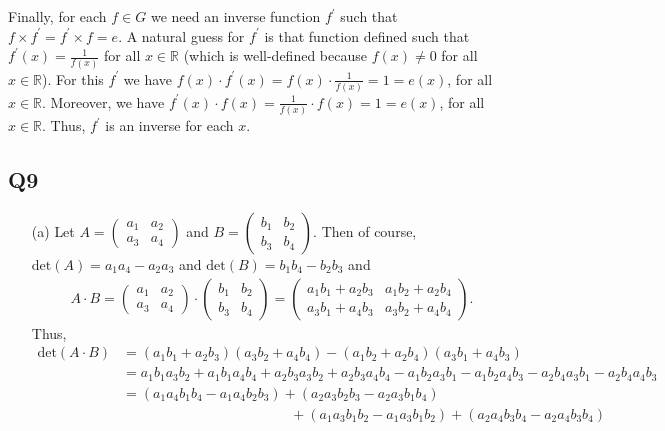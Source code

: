\documentclass[12pt]{article}
\def\R{{\mathbb R}}        %
\numberwithin{theorem}{section}
\numberwithin{equation}{section}
\numberwithin{remark}{section}
\numberwithin{definition}{section}
\numberwithin{theorem}{section}
\numberwithin{lemma}{section}
\numberwithin{example}{section}
\begin{document}
Finally, for each $f\in G$ we need an inverse function $f^\prime$ such that $f\times f^\prime = f^\prime \times f = e$. A natural guess for $f^\prime$ is that function defined such that $f^\prime(x)=\frac{1}{f(x)}$ for all $x\in \R$ (which is well-defined because $f(x)\neq0$ for all $x\in \R$). For this $f^\prime$ we have $f(x)\cdot f^\prime(x)=f(x)\cdot\frac{1}{f(x)}=1=e(x)$, for all $x\in \R$. Moreover, we have $f^\prime(x)\cdot f(x)=\frac{1}{f(x)}\cdot f(x)=1=e(x)$, for all $x\in \R$. Thus, $f^\prime$ is an inverse for each $x$. 



\subsection{Q9}

\begin{itemize}
	\item[(a)]{Let $A=\begin{pmatrix}a_1 & a_2\\ a_3 & a_4 \end{pmatrix}$ and $B=\begin{pmatrix}b_1 & b_2\\ b_3 & b_4 \end{pmatrix}$. Then of course, $\text{det}(A)=a_1a_4-a_2a_3$ and $\text{det}(B)=b_1b_4-b_2b_3$ and
		\begin{align*}
			A\cdot B = \begin{pmatrix}a_1 & a_2\\ a_3 & a_4 \end{pmatrix}\cdot \begin{pmatrix}b_1 & b_2\\ b_3 & b_4 \end{pmatrix} = \begin{pmatrix}a_1 b_1+a_2b_3& a_1b_2+a_2b_4\\ a_3b_1+a_4b_3 & a_3b_2+a_4b_4 \end{pmatrix}.
		\end{align*}
	Thus, 	
		\begin{align*}
			\text{det}(A\cdot B) & = (a_1 b_1+a_2b_3)(a_3b_2+a_4b_4) - (a_1b_2+a_2b_4) (a_3b_1+a_4b_3) \\
			& = a_1b_1a_3b_2+a_1b_1a_4b_4+a_2b_3a_3b_2+a_2b_3a_4b_4-a_1b_2a_3b_1-a_1b_2a_4b_3-a_2b_4a_3b_1-a_2b_4a_4b_3\\
			& = (a_1a_4b_1b_4-a_1a_4b_2b_3)+(a_2a_3b_2b_3-a_2a_3b_1b_4)\\
			&\qquad\qquad\qquad\qquad\qquad\qquad+(a_1a_3b_1b_2-a_1a_3b_1b_2)+(a_2a_4b_3b_4-a_2a_4b_3b_4)\\

\end{align*}}
\end{itemize}
\end{document}
